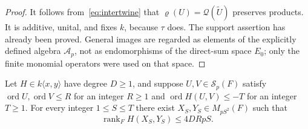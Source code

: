 \documentclass{article}
\newcommand{\ord}{\operatorname{ord}}
\newcommand{\rank}{\operatorname{rank}}
\newcommand{\Sf}{\mathcal S}
\newcommand{\Af}{\mathcal A}
\begin{document}
\begin{proof}
It follows from~\eqref{eq:intertwine} that $\varrho(U)=\mathcal Q(\widetilde U)$ preserves products. It is additive, unital, and fixes $k$, because $\tau$ does. The support assertion has already been proved. General images are regarded as elements of the explicitly defined algebra $\Af_p$, not as endomorphisms of the direct-sum space $E_0$; only the finite monomial operators were used on that space.
\end{proof}

\begin{proposition}\label{prop:compression}
Let $H\in k\langle x,y\rangle$ have degree $D\geq1$, and suppose $U,V\in\Sf_p(F)$ satisfy $\ord U,\ord V\leq R$ for an integer $R\geq1$ and $\ord H(U,V)\leq-T$ for an integer $T\geq1$. For every integer $1\leq S\leq T$ there exist $X_S,Y_S\in M_{pS^2}(F)$ such that
\[
 \rank_F H(X_S,Y_S)\leq4DRpS.
 \tag{6.10}\label{eq:rankcompression}
\]
\end{proposition}
\end{document}
